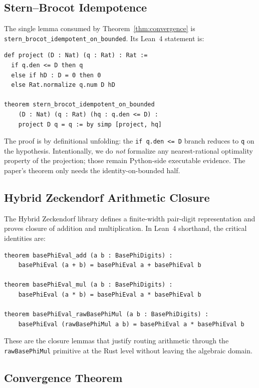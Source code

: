 \documentclass[11pt,a4paper]{article}
\begin{document}
\subsection{Stern--Brocot Idempotence}

The single lemma consumed by Theorem~\ref{thm:convergence} is
\texttt{stern\_brocot\_idempotent\_on\_bounded}. Its Lean~4 statement is:

\begin{lstlisting}
def project (D : Nat) (q : Rat) : Rat :=
  if q.den <= D then q
  else if hD : D = 0 then 0
  else Rat.normalize q.num D hD

theorem stern_brocot_idempotent_on_bounded
    (D : Nat) (q : Rat) (hq : q.den <= D) :
    project D q = q := by simp [project, hq]
\end{lstlisting}

The proof is by definitional unfolding: the \texttt{if q.den <= D}
branch reduces to \texttt{q} on the hypothesis. Intentionally, we do
\emph{not} formalize any nearest-rational optimality property of the
projection; those remain Python-side executable evidence. The paper's
theorem only needs the identity-on-bounded half.

\subsection{Hybrid Zeckendorf Arithmetic Closure}

The Hybrid Zeckendorf library defines a finite-width pair-digit
representation and proves closure of addition and multiplication. In
Lean~4 shorthand, the critical identities are:

\begin{lstlisting}
theorem basePhiEval_add (a b : BasePhiDigits) :
    basePhiEval (a + b) = basePhiEval a + basePhiEval b

theorem basePhiEval_mul (a b : BasePhiDigits) :
    basePhiEval (a * b) = basePhiEval a * basePhiEval b

theorem basePhiEval_rawBasePhiMul (a b : BasePhiDigits) :
    basePhiEval (rawBasePhiMul a b) = basePhiEval a * basePhiEval b
\end{lstlisting}

These are the closure lemmas that justify routing arithmetic through
the \texttt{rawBasePhiMul} primitive at the Rust level without leaving
the algebraic domain.

\subsection{Convergence Theorem}
\end{document}
